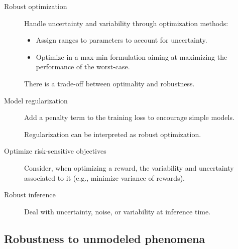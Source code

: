 \begin{description}
    \item[Robust optimization] 
        Handle uncertainty and variability through optimization methods:
        \begin{itemize}
            \item Assign ranges to parameters to account for uncertainty.
            \item Optimize in a max-min formulation aiming at maximizing the performance of the worst-case.
        \end{itemize}

        \begin{remark}
            There is a trade-off between optimality and robustness.
        \end{remark}

    \item[Model regularization] 
        Add a penalty term to the training loss to encourage simple models.

        \begin{theorem}
            Regularization can be interpreted as robust optimization.
        \end{theorem}

    \item[Optimize risk-sensitive objectives] 
        Consider, when optimizing a reward, the variability and uncertainty associated to it (e.g., minimize variance of rewards).
    
    \item[Robust inference] 
        Deal with uncertainty, noise, or variability at inference time.
\end{description}


\subsection{Robustness to unmodeled phenomena}

